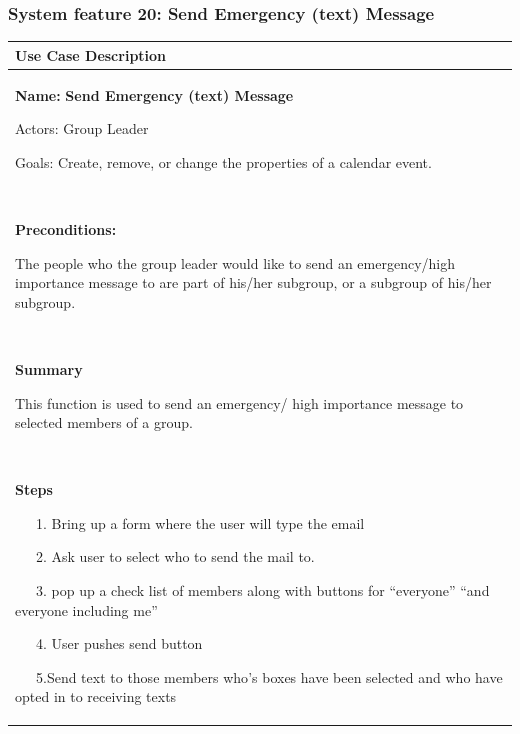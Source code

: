 \documentclass[letterpaper]{article}
\newcommand\textstyleDefaultParagraphFont[1]{#1}
\begin{document}
\bigskip


\bigskip


\bigskip


\bigskip


\bigskip


\bigskip


\bigskip

\subsubsection[System feature 20: Send Emergency (text)
Message]{\rmfamily System feature 20: Send Emergency (text) Message}
\begin{flushleft}
\tablehead{}
\begin{supertabular}{|m{6.42126in}|}
\hline
\bfseries\color{black} Use Case Description\\\hline
{\color{black} \textstyleDefaultParagraphFont{\textbf{Name:
}}\textstyleDefaultParagraphFont{\textsf{\textbf{Send Emergency (text)
Message}}}}

{\color{black} Actors: Group Leader}

{\color{black} Goals: Create, remove, or change the properties of a
calendar event.}

~

{\bfseries\color{black} Preconditions:}

{\color{black} The people who the group leader would like to send an
emergency/high importance message to are part of his/her subgroup, or a
subgroup of his/her subgroup.}

~

{\bfseries\color{black} Summary}

{\color{black} This function is used to send an emergency/ high
importance message to selected members of a group.}

~

{\bfseries\color{black} Steps}

{\color{black} \ \ \ 1. Bring up a form where the user will type the
email}

{\color{black} \ \ \ 2. Ask user to select who to send the mail to. }

{\color{black} \ \ \ 3. pop up a check list of members along with
buttons for {\textquotedblleft}everyone{\textquotedblright}
{\textquotedblleft}and everyone including me{\textquotedblright}}

{\color{black} \ \ \ 4. User pushes send button}

{\color{black} \ \ \ 5.Send text to those members who{\textquoteright}s
boxes have been selected and who have opted in to receiving texts}


\end{supertabular}
\end{flushleft}
\end{document}
